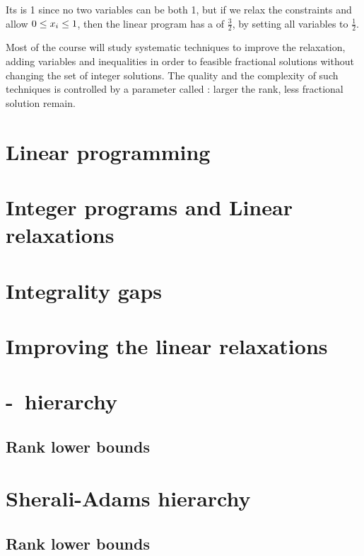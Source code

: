 \documentclass[a4paper,twoside,justified]{tufte-handout}
\begin{document}
Its  is 1 since no two variables can be
both 1, but if we relax the constraints and allow $ \varbounded{x_{i}}
$, then the linear program has a 
of $ \frac{3}{2} $, by setting all variables to $\frac{1}{2}$.

Most of the course will study systematic techniques to improve the
relaxation, adding variables and inequalities in order to
 feasible fractional solutions without changing
the set of integer solutions. The quality and the complexity of such
techniques is controlled by a parameter called :
larger the rank, less fractional solution remain.

\section{Linear programming}

\section{Integer programs and Linear relaxations}


\section{Integrality gaps}


\section{Improving the linear relaxations}


\section{\Lovasz-\Schrijver\ hierarchy}

\subsection{Rank lower bounds}

\section{Sherali-Adams hierarchy}

\subsection{Rank lower bounds}




\end{document}
